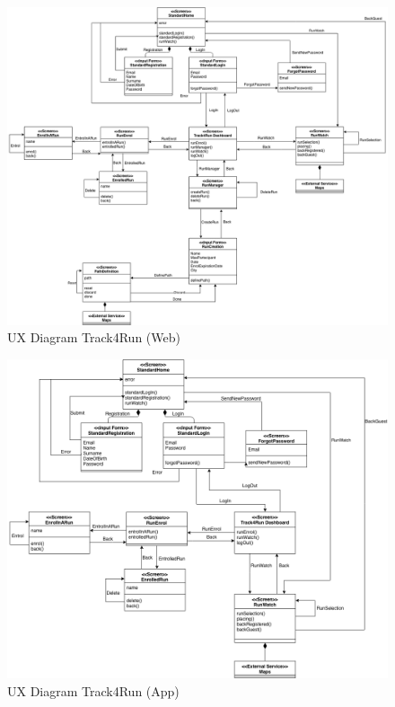 \begin{figure}[H]
  \begin{center}
  	\includegraphics[width=0.68\paperwidth]{./img/UXDiagram/UX_Diagram_Track4Run_Web.png}
    \hspace{0.05\linewidth}
    \centering
    \caption{UX Diagram Track4Run (Web)}
		\label{img:Track4RunWeb}
    \end{center}
\end{figure}

\begin{figure}[H]
  \begin{center}
  	\includegraphics[width=0.68\paperwidth]{./img/UXDiagram/UX_Diagram_Track4Run_App.png}
    \hspace{0.05\linewidth}
    \centering
    \caption{UX Diagram Track4Run (App)}
		\label{img:Track4RunApp}
    \end{center}
\end{figure}

